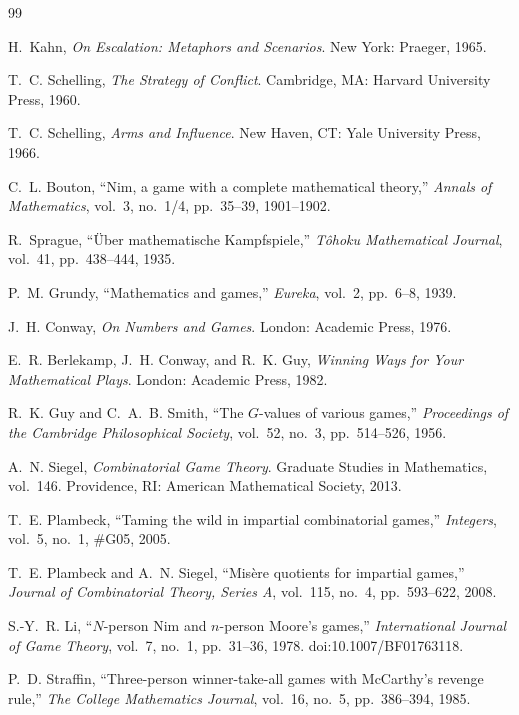 \documentclass[11pt]{article}
\theoremstyle{plain}
\theoremstyle{definition}
\theoremstyle{remark}
\begin{document}
\begin{thebibliography}{99}

H.~Kahn, \emph{On Escalation: Metaphors and Scenarios}.
New York: Praeger, 1965.

T.~C. Schelling, \emph{The Strategy of Conflict}.
Cambridge, MA: Harvard University Press, 1960.

T.~C. Schelling, \emph{Arms and Influence}.
New Haven, CT: Yale University Press, 1966.

C.~L. Bouton, ``Nim, a game with a complete mathematical theory,''
\emph{Annals of Mathematics}, vol.~3, no.~1/4, pp.~35--39, 1901--1902.

R.~Sprague, ``\"Uber mathematische Kampfspiele,''
\emph{T\^ohoku Mathematical Journal}, vol.~41, pp.~438--444, 1935.

P.~M. Grundy, ``Mathematics and games,''
\emph{Eureka}, vol.~2, pp.~6--8, 1939.

J.~H. Conway, \emph{On Numbers and Games}.
London: Academic Press, 1976.

E.~R. Berlekamp, J.~H. Conway, and R.~K. Guy,
\emph{Winning Ways for Your Mathematical Plays}.
London: Academic Press, 1982.

R.~K. Guy and C.~A.~B. Smith, ``The $G$-values of various games,''
\emph{Proceedings of the Cambridge Philosophical Society},
vol.~52, no.~3, pp.~514--526, 1956.

A.~N. Siegel, \emph{Combinatorial Game Theory}.
Graduate Studies in Mathematics, vol.~146.
Providence, RI: American Mathematical Society, 2013.

T.~E. Plambeck, ``Taming the wild in impartial combinatorial games,''
\emph{Integers}, vol.~5, no.~1, \#G05, 2005.

T.~E. Plambeck and A.~N. Siegel,
``Mis\`ere quotients for impartial games,''
\emph{Journal of Combinatorial Theory, Series A},
vol.~115, no.~4, pp.~593--622, 2008.

S.-Y.~R. Li, ``$N$-person Nim and $n$-person Moore's games,''
\emph{International Journal of Game Theory},
vol.~7, no.~1, pp.~31--36, 1978.
doi:10.1007/BF01763118.

P.~D. Straffin, ``Three-person winner-take-all games with
McCarthy's revenge rule,''
\emph{The College Mathematics Journal},
vol.~16, no.~5, pp.~386--394, 1985.


\end{thebibliography}
\end{document}
